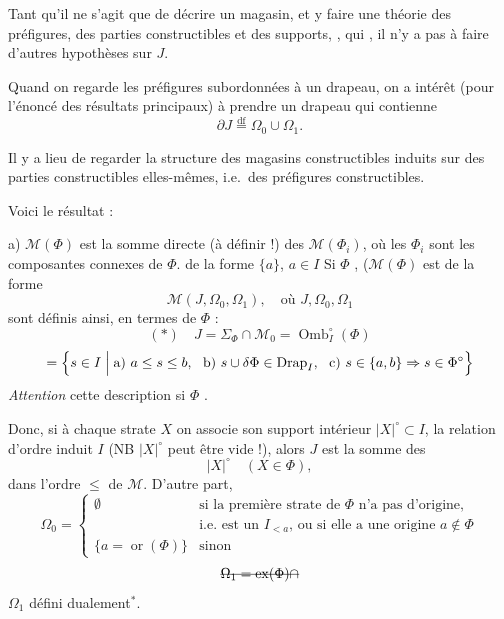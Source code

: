 \documentclass[11pt,a4paper]{article}
\begin{document}
Tant qu'il ne s'agit que de décrire un magasin, et y faire une théorie des préfigures, des parties constructibles et des supports, , qui , il n'y a pas à faire d'autres hypothèses sur $J$.

Quand on regarde les préfigures subordonnées à un drapeau, on  a intérêt (pour l'énoncé des résultats principaux) à prendre un drapeau qui contienne
\[
  \partial J \overset{\mathrm{df}}{=} \Omega_0\cup\Omega_1 .
\]

Il y a lieu de regarder la structure des magasins constructibles  induits sur des parties constructibles \add{$\Phi$} elles-mêmes, i.e.\ des préfigures constructibles.

Voici le résultat :

a) $\mathcal{M}(\Phi)$ est la somme directe (à définir !) des $\mathcal{M}(\Phi_i)$, où les $\Phi_i$ sont les composantes \add{\ill{}} connexes de $\Phi$.  de la forme $\{a\}$, $a\in I$
 Si $\Phi$ , ($\mathcal{M}(\Phi)$ est de la forme
\[
  \mathcal{M}(J,\Omega_0,\Omega_1), \quad\text{où } J,\Omega_0,\Omega_1
\]
sont définis ainsi, en termes de $\Phi$ :
\[
  (*)\quad J=\Sigma_\Phi\cap\mathcal{M}_0=\operatorname{Omb}^{\circ}_{I}(\Phi)
\]
\[
  =\Bigl\{s\in I \Bigm| \text{a) } a\leq s\leq b,\ \ \text{b) } s\cup\delta\Phi\in\operatorname{Drap}_I,\ \ \text{c) } s\in\{a,b\}\Rightarrow s\in\Phi^{\circ}\Bigr\}
\]
\textit{Attention} cette description \ill{} si $\Phi$ \ill{}.

Donc, si à chaque strate $X$  on associe son support intérieur $|X|^{\circ}\subset I$,  la relation d'ordre induit  $I$ (NB $|X|^{\circ}$ peut être vide  !), alors $J$ est la somme   des
\[
  |X|^{\circ}\quad (X\in\Phi),
\]
 dans l'ordre $\leq$ de $\mathcal{M}$.
D'autre part,  \struck{\ill{}}
\[
  \Omega_0=\begin{cases}
    \emptyset & \text{si la première strate de $\Phi$ n'a pas d'origine,}\\
              & \text{i.e. est un $I_{<a}$, ou si elle a une origine $a\notin\Phi$}\\
    \{a=\operatorname{or}(\Phi)\} & \text{sinon}
  \end{cases}
\]
\[
  \text{\struck{$\Omega_1=\operatorname{ex}(\Phi)\cap$}}
\]
$\Omega_1$ défini dualement${}^{*}$.
\end{document}
